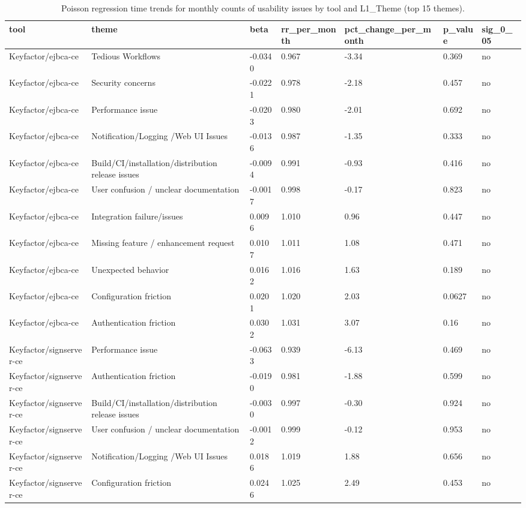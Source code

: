 \begin{table}[t]
\centering
\caption{Poisson regression time trends for monthly counts of usability issues by tool and L1_Theme (top 15 themes).}
\label{tab:poisson-l1_theme}
\scriptsize
\begin{tabular}{lllllll}
\hline
tool & theme & beta & rr\_per\_month & pct\_change\_per\_month & p\_value & sig\_0\_05 \\
\hline
Keyfactor/ejbca-ce & Tedious Workflows & -0.0340 & 0.967 & -3.34 & 0.369 & no \\
Keyfactor/ejbca-ce & Security concerns & -0.0221 & 0.978 & -2.18 & 0.457 & no \\
Keyfactor/ejbca-ce & Performance issue & -0.0203 & 0.980 & -2.01 & 0.692 & no \\
Keyfactor/ejbca-ce & Notification/Logging /Web UI Issues & -0.0136 & 0.987 & -1.35 & 0.333 & no \\
Keyfactor/ejbca-ce & Build/CI/installation/distribution release issues & -0.0094 & 0.991 & -0.93 & 0.416 & no \\
Keyfactor/ejbca-ce & User confusion / unclear documentation & -0.0017 & 0.998 & -0.17 & 0.823 & no \\
Keyfactor/ejbca-ce & Integration failure/issues & 0.0096 & 1.010 & 0.96 & 0.447 & no \\
Keyfactor/ejbca-ce & Missing feature / enhancement request & 0.0107 & 1.011 & 1.08 & 0.471 & no \\
Keyfactor/ejbca-ce & Unexpected behavior & 0.0162 & 1.016 & 1.63 & 0.189 & no \\
Keyfactor/ejbca-ce & Configuration friction & 0.0201 & 1.020 & 2.03 & 0.0627 & no \\
Keyfactor/ejbca-ce & Authentication friction & 0.0302 & 1.031 & 3.07 & 0.16 & no \\
Keyfactor/signserver-ce & Performance issue & -0.0633 & 0.939 & -6.13 & 0.469 & no \\
Keyfactor/signserver-ce & Authentication friction & -0.0190 & 0.981 & -1.88 & 0.599 & no \\
Keyfactor/signserver-ce & Build/CI/installation/distribution release issues & -0.0030 & 0.997 & -0.30 & 0.924 & no \\
Keyfactor/signserver-ce & User confusion / unclear documentation & -0.0012 & 0.999 & -0.12 & 0.953 & no \\
Keyfactor/signserver-ce & Notification/Logging /Web UI Issues & 0.0186 & 1.019 & 1.88 & 0.656 & no \\
Keyfactor/signserver-ce & Configuration friction & 0.0246 & 1.025 & 2.49 & 0.453 & no \\

\end{tabular}
\end{table}
